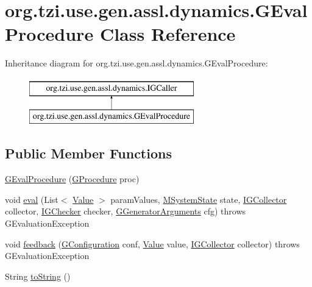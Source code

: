 \hypertarget{classorg_1_1tzi_1_1use_1_1gen_1_1assl_1_1dynamics_1_1_g_eval_procedure}{\section{org.\-tzi.\-use.\-gen.\-assl.\-dynamics.\-G\-Eval\-Procedure Class Reference}
\label{classorg_1_1tzi_1_1use_1_1gen_1_1assl_1_1dynamics_1_1_g_eval_procedure}
}
Inheritance diagram for org.\-tzi.\-use.\-gen.\-assl.\-dynamics.\-G\-Eval\-Procedure\-:\begin{figure}[H]
\begin{center}
\leavevmode
\includegraphics[height=2.000000cm]{classorg_1_1tzi_1_1use_1_1gen_1_1assl_1_1dynamics_1_1_g_eval_procedure}
\end{center}
\end{figure}
\subsection*{Public Member Functions}
\begin{DoxyCompactItemize}
\item 
\hyperlink{classorg_1_1tzi_1_1use_1_1gen_1_1assl_1_1dynamics_1_1_g_eval_procedure_ae9b076d6654592d3a11880a99547cb98}{G\-Eval\-Procedure} (\hyperlink{classorg_1_1tzi_1_1use_1_1gen_1_1assl_1_1statics_1_1_g_procedure}{G\-Procedure} proc)
\item 
void \hyperlink{classorg_1_1tzi_1_1use_1_1gen_1_1assl_1_1dynamics_1_1_g_eval_procedure_a291c4973a7a809395070911380dbcefe}{eval} (List$<$ \hyperlink{classorg_1_1tzi_1_1use_1_1uml_1_1ocl_1_1value_1_1_value}{Value} $>$ param\-Values, \hyperlink{classorg_1_1tzi_1_1use_1_1uml_1_1sys_1_1_m_system_state}{M\-System\-State} state, \hyperlink{interfaceorg_1_1tzi_1_1use_1_1gen_1_1assl_1_1dynamics_1_1_i_g_collector}{I\-G\-Collector} collector, \hyperlink{interfaceorg_1_1tzi_1_1use_1_1gen_1_1assl_1_1dynamics_1_1_i_g_checker}{I\-G\-Checker} checker, \hyperlink{classorg_1_1tzi_1_1use_1_1gen_1_1tool_1_1_g_generator_arguments}{G\-Generator\-Arguments} cfg)  throws G\-Evaluation\-Exception 
\item 
void \hyperlink{classorg_1_1tzi_1_1use_1_1gen_1_1assl_1_1dynamics_1_1_g_eval_procedure_a93876b098e94247b3b535257e56f1f0f}{feedback} (\hyperlink{classorg_1_1tzi_1_1use_1_1gen_1_1assl_1_1dynamics_1_1_g_configuration}{G\-Configuration} conf, \hyperlink{classorg_1_1tzi_1_1use_1_1uml_1_1ocl_1_1value_1_1_value}{Value} value, \hyperlink{interfaceorg_1_1tzi_1_1use_1_1gen_1_1assl_1_1dynamics_1_1_i_g_collector}{I\-G\-Collector} collector)  throws G\-Evaluation\-Exception 
\item 
String \hyperlink{classorg_1_1tzi_1_1use_1_1gen_1_1assl_1_1dynamics_1_1_g_eval_procedure_abbd991f45758e8aad213dc4d71c6ff3f}{to\-String} ()
\end{DoxyCompactItemize}



